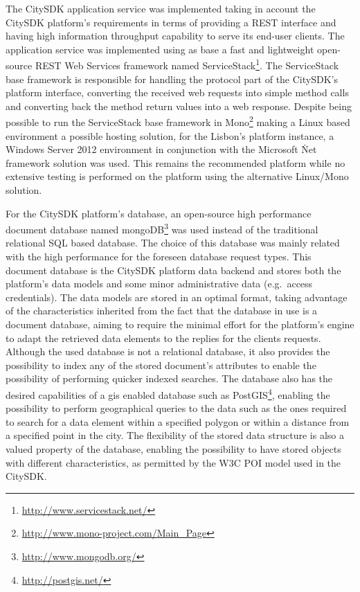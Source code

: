 \documentclass[times,doublespace]{ettauth}%
\begin{document}
The CitySDK application service was implemented taking in account the CitySDK platform's requirements in terms of providing a REST interface and having high information throughput capability to serve its end-user clients. 
The application service was implemented using as base a fast and lightweight open-source REST Web Services framework named ServiceStack\footnote{\url{http://www.servicestack.net/}}. The ServiceStack base framework is responsible for handling the protocol part of the CitySDK's platform interface, converting the received web requests into simple method calls and converting back the method return values into a web response. 
Despite being possible to run the ServiceStack base framework in Mono\footnote{\url{http://www.mono-project.com/Main_Page}} making a Linux based environment a possible hosting solution, for the Lisbon's platform instance, a Windows Server 2012 environment in conjunction with the Microsoft \.Net framework solution was used.
This remains the recommended platform while no extensive testing is performed on the platform using the alternative Linux/Mono solution.

For the CitySDK platform's database, an open-source high performance document database named mongoDB\footnote{\url{http://www.mongodb.org/}} was used instead of the traditional relational SQL based database.
The choice of this database was mainly related with the high performance for the foreseen database request types. 
This document database is the CitySDK platform data backend and stores both the platform's data models and some minor administrative data (e.g.\  access credentials). 
The data models are stored in an optimal format, taking advantage of the characteristics inherited from the fact that the database in use is a document database, aiming to require the minimal effort for the platform's engine to adapt the retrieved data elements to the replies for the clients requests. 
Although the used database is not a relational database, it also provides the possibility to index any of the stored document's attributes to enable the possibility of performing quicker indexed searches. 
The database also has the desired capabilities of a \ac{gis} enabled database such as PostGIS\footnote{\url{http://postgis.net/}}, enabling the possibility to perform geographical queries to the data such as the ones required to search for a data element within a specified polygon or within a distance from a specified point in the city. 
The flexibility of the stored data structure is also a valued property of the database, enabling the possibility to have stored objects with different characteristics, as permitted by the W3C POI model used in the CitySDK.
\end{document}
